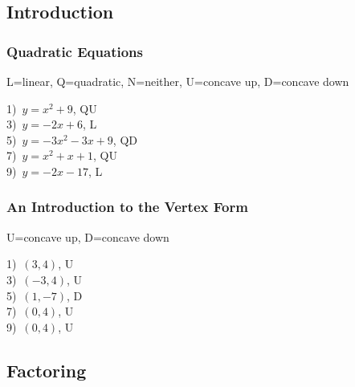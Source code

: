 \documentclass[11pt]{book}
\newcommand{\tmstrong}[1]{\textbf{#1}}
\theoremstyle{definition}  %
\begin{document}
\subsection*{Introduction}

\subsubsection{Quadratic Equations}
 L=linear, Q=quadratic, N=neither, U=concave up, D=concave down
\begin{multicols}{2}
  1)~$y=x^2 + 9$, QU\\
	3)~$y=-2x+6$, L\\
	5)~$y=-3x^2-3x+9$, QD\\
  7)~$y=x^2+x+1$, QU\\
  9)~$y=-2x-17$, L%
\end{multicols}


\subsubsection{An Introduction to the Vertex Form} 

U=concave up, D=concave down%

\begin{multicols}{2}
  1)~$(3,4)$, U\\
  3)~$(-3,4)$, U\\
  5)~$(1,-7)$, D\\
  7)~$(0,4)$, U\\
  9)~$(0,4)$, U%
\end{multicols}

\subsection*{Factoring}
\end{document}
